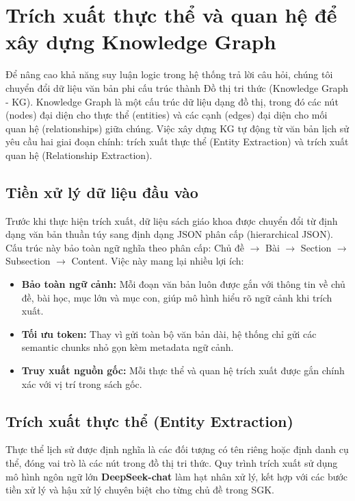 \section{Trích xuất thực thể và quan hệ để xây dựng Knowledge Graph}
\label{sec:kg_construction}

Để nâng cao khả năng suy luận logic trong hệ thống trả lời câu hỏi, chúng tôi chuyển đổi dữ liệu văn bản phi cấu trúc thành Đồ thị tri thức (Knowledge Graph - KG). Knowledge Graph là một cấu trúc dữ liệu dạng đồ thị, trong đó các nút (nodes) đại diện cho thực thể (entities) và các cạnh (edges) đại diện cho mối quan hệ (relationships) giữa chúng. Việc xây dựng KG tự động từ văn bản lịch sử yêu cầu hai giai đoạn chính: trích xuất thực thể (Entity Extraction) và trích xuất quan hệ (Relationship Extraction).

\subsection{Tiền xử lý dữ liệu đầu vào}
\label{subsec:data_preprocessing}

Trước khi thực hiện trích xuất, dữ liệu sách giáo khoa được chuyển đổi từ định dạng văn bản thuần túy sang định dạng JSON phân cấp (hierarchical JSON). Cấu trúc này bảo toàn ngữ nghĩa theo phân cấp: Chủ đề $\rightarrow$ Bài $\rightarrow$ Section $\rightarrow$ Subsection $\rightarrow$ Content. Việc này mang lại nhiều lợi ích:

\begin{itemize}
    \item \textbf{Bảo toàn ngữ cảnh:} Mỗi đoạn văn bản luôn được gắn với thông tin về chủ đề, bài học, mục lớn và mục con, giúp mô hình hiểu rõ ngữ cảnh khi trích xuất.
    \item \textbf{Tối ưu token:} Thay vì gửi toàn bộ văn bản dài, hệ thống chỉ gửi các semantic chunks nhỏ gọn kèm metadata ngữ cảnh.
    \item \textbf{Truy xuất nguồn gốc:} Mỗi thực thể và quan hệ trích xuất được gắn chính xác với vị trí trong sách gốc.
\end{itemize}

\subsection{Trích xuất thực thể (Entity Extraction)}
\label{subsec:entity_extraction}

Thực thể lịch sử được định nghĩa là các đối tượng có tên riêng hoặc định danh cụ thể, đóng vai trò là các nút trong đồ thị tri thức. Quy trình trích xuất sử dụng mô hình ngôn ngữ lớn \textbf{DeepSeek-chat} làm hạt nhân xử lý, kết hợp với các bước tiền xử lý và hậu xử lý chuyên biệt cho từng chủ đề trong SGK.

